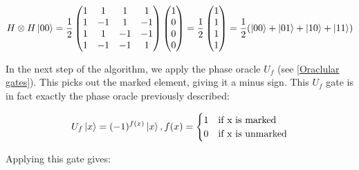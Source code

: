 \begin{align}
        H \otimes H \left\vert{00}\right\rangle = 
        \frac{1}{2}
        \begin{pmatrix}
        1 & 1 & 1 & 1 \\
        1 & -1 & 1 & -1\\
        1  & 1 & -1 & -1 \\
        1 & -1 & -1 & 1
        \end{pmatrix}
        \begin{pmatrix}
        1\\
        0\\
        0\\
        0\\
        \end{pmatrix}
        =
        \frac{1}{2}
        \begin{pmatrix}
        1\\
        1\\
        1\\
        1\\
        \end{pmatrix}
        = \frac{1}{2}(\left\vert{00}\right\rangle + \left\vert{01}\right\rangle +\left\vert{10}\right\rangle + \left\vert{11}\right\rangle)
\end{align}

In the next step of the algorithm, we apply the phase oracle $U_f$ (see \autoref{Oraclular gates}). This picks out the marked element, giving it a minus sign. This $U_f$ gate is in fact exactly the phase oracle previously described:

\begin{align}
    U_f \left\vert{x}\right\rangle=(-1)^{f(x)}\left\vert{x}\right\rangle,  
    f(x) = \begin{cases}
        1 & \text{if x is marked}  \\
        0 & \text{if x is unmarked} \\
    \end{cases}
\end{align}

Applying this gate gives:

